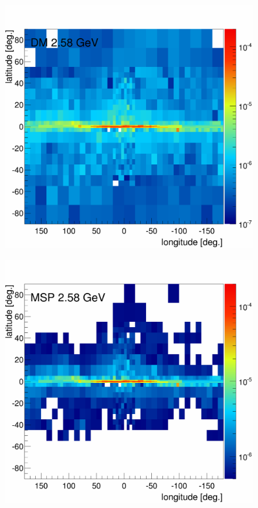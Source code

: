 \begin{figure}[h]
\begin{minipage}[h]{0.45\textwidth}
  	\label{fig:MCRonly_skymap_MCR}
  \end{minipage}
  \hfill
  \begin{minipage}[h]{0.45\textwidth}
  	\centering
	\includegraphics[width=1\linewidth]{pic/results/DMonly_DM_fluxE12_skymap.png}
  	\label{fig:DMonly_skymap_DM}
  \end{minipage}
  \hfill
  \begin{minipage}[h]{0.45\textwidth}
  	\centering
	\includegraphics[width=1\linewidth]{pic/results/MSPonly_MSP_fluxE12_skymap.png}
  	\label{fig:MSP_only_CMZ}
  \end{minipage}
  \label{fig:Excess_comp_flux_comparison}
\end{figure}


